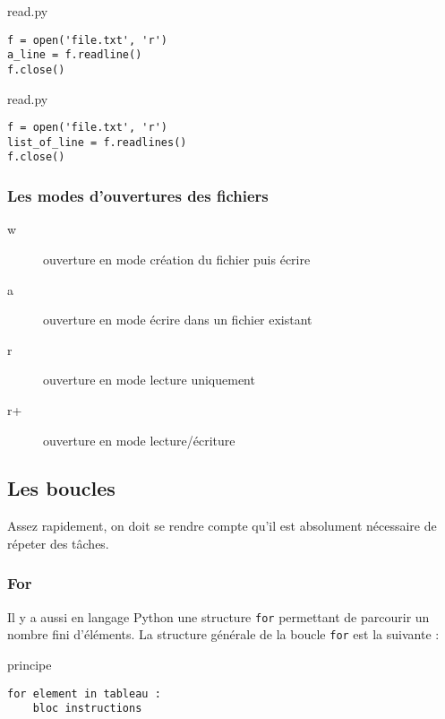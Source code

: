 \vskip 2pt
\begin{center}
  \begin{myterminalbox}[colback=gray!10]{read.py}
\begin{verbatim}
f = open('file.txt', 'r')
a_line = f.readline()
f.close()
\end{verbatim}
  \end{myterminalbox}
\end{center}

\vskip 2pt
\begin{center}
  \begin{myterminalbox}[colback=gray!10]{read.py}
\begin{verbatim}
f = open('file.txt', 'r')
list_of_line = f.readlines()
f.close()
\end{verbatim}
  \end{myterminalbox}
\end{center}


\subsubsection{Les modes d'ouvertures des fichiers}


\begin{description}
\item[w] ouverture en mode création du fichier puis écrire
\item[a] ouverture en mode écrire dans un fichier existant
\item[r] ouverture en mode lecture uniquement
\item[r+] ouverture en mode lecture/écriture
\end{description}







\subsection{Les boucles}

Assez rapidement, on doit se rendre compte qu'il est absolument nécessaire de répeter des tâches.


\subsubsection{For}

Il y a aussi en langage Python une structure \texttt{for} permettant de parcourir un nombre
fini d'éléments.
La structure générale de la boucle \texttt{for} est la suivante :
\vskip 2pt
\begin{center}
  \begin{myterminalbox}[colback=gray!10]{principe}
\begin{verbatim}
for element in tableau :
    bloc instructions
\end{verbatim}
  \end{myterminalbox}
\end{center}

